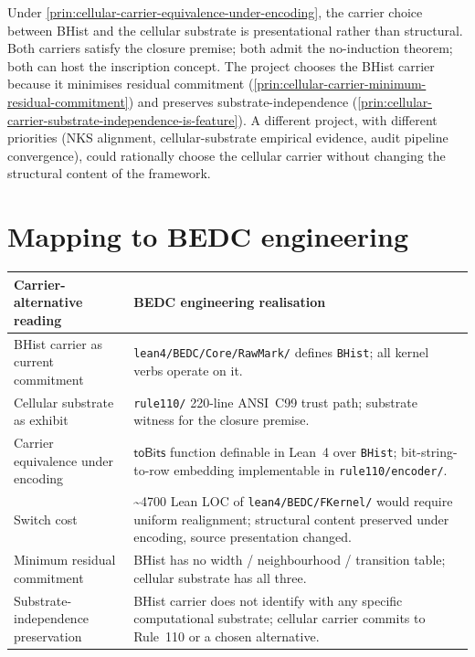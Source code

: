 \begin{principle}
\label{prin:cellular-carrier-presentational-decision}
Under \autoref{prin:cellular-carrier-equivalence-under-encoding}, the carrier choice between BHist and the cellular substrate is presentational rather than structural. Both carriers satisfy the closure premise; both admit the no-induction theorem; both can host the inscription concept. The project chooses the BHist carrier because it minimises residual commitment (\autoref{prin:cellular-carrier-minimum-residual-commitment}) and preserves substrate-independence (\autoref{prin:cellular-carrier-substrate-independence-is-feature}). A different project, with different priorities (NKS alignment, cellular-substrate empirical evidence, audit pipeline convergence), could rationally choose the cellular carrier without changing the structural content of the framework.
\end{principle}

\section{Mapping to BEDC engineering}
\label{sec:cellular-carrier-mapping-engineering}

\begin{longtable}{p{}p{}}
\toprule
\textbf{Carrier-alternative reading} & \textbf{BEDC engineering realisation} \\
\midrule
BHist carrier as current commitment &
\texttt{lean4/BEDC/Core/RawMark/} defines \texttt{BHist}; all kernel verbs operate on it. \\
\midrule
Cellular substrate as exhibit &
\texttt{rule110/} 220-line ANSI~C99 trust path; substrate witness for the closure premise. \\
\midrule
Carrier equivalence under encoding &
$\mathsf{toBits}$ function definable in Lean~4 over \texttt{BHist}; bit-string-to-row embedding implementable in \texttt{rule110/encoder/}. \\
\midrule
Switch cost &
\textasciitilde 4700 Lean LOC of \texttt{lean4/BEDC/FKernel/} would require uniform realignment; structural content preserved under encoding, source presentation changed. \\
\midrule
Minimum residual commitment &
BHist has no width / neighbourhood / transition table; cellular substrate has all three. \\
\midrule
Substrate-independence preservation &
BHist carrier does not identify with any specific computational substrate; cellular carrier commits to Rule~110 or a chosen alternative. \\
\bottomrule
\end{longtable}

